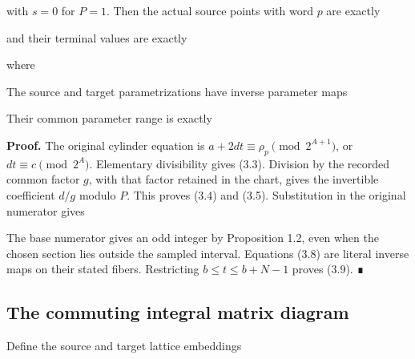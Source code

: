
with \(s=0\) for \(P=1\). Then the actual source points with word \(p\)
are exactly


and their terminal values are exactly


where


The source and target parametrizations have inverse parameter maps


Their common parameter range is exactly


\textbf{Proof.} The original cylinder equation is
\(a+2dt\equiv\rho_p\pmod {2^{A+1}}\), or \(dt\equiv c\pmod {2^A}\).
Elementary divisibility gives (3.3). Division by the recorded common
factor \(g\), with that factor retained in the chart, gives the
invertible coefficient \(d/g\) modulo \(P\). This proves (3.4) and
(3.5). Substitution in the original numerator gives


The base numerator gives an odd integer by Proposition 1.2, even when
the chosen section lies outside the sampled interval. Equations (3.8)
are literal inverse maps on their stated fibers. Restricting
\(b\le t\le b+N-1\) proves (3.9). ∎

\subsection{The commuting integral matrix diagram}

Define the source and target lattice embeddings


